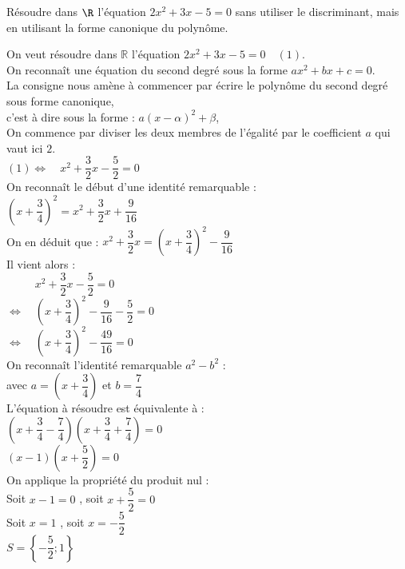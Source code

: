 \documentclass[a4paper,11pt,exos]{nsi} %
\begin{document}
\maketitle

\begin{exercice}%
    Résoudre dans $\R$ l'équation $2x^2+3x-5=0$ sans utiliser le discriminant, mais en utilisant la forme canonique du polynôme.
    
\end{exercice}

On veut résoudre dans $\mathbb{R}$ l'équation $2x^2+3x-5=0\quad(1)$.\\On reconnaît une équation du second degré sous la forme $ax^2+bx+c = 0$.\\La consigne nous amène à commencer par écrire le polynôme du second degré sous forme canonique, \\c'est à dire sous la forme :  $a(x-\alpha)^2+\beta$,\\On commence par diviser les deux membres de l'égalité par le coefficient $a$ qui vaut ici $2$.\\$(1)\iff\quad x^2 +\dfrac{3}{2} x -\dfrac{5}{2}=0$\\[.5em]On reconnaît le début d'une identité remarquable :\\$\left(x +\dfrac{3}{4}\right)^2=x^2 +\dfrac{3}{2}x+\dfrac{9}{16} $\\On en déduit que :  $x^2 +\dfrac{3}{2}x= \left(x +\dfrac{3}{4}\right)^2    -\dfrac{9}{16} $\\Il vient alors :\\$\phantom{\iff}\quad x^2 +\dfrac{3}{2} x -\dfrac{5}{2}=0$\\$\iff\quad  \left(x +\dfrac{3}{4}\right)^2    -\dfrac{9}{16}-\dfrac{5}{2}=0$\\$\iff\quad  \left(x +\dfrac{3}{4}\right)^2    -\dfrac{49}{16}=0$\\On reconnaît l'identité remarquable $a^2-b^2$ :\\avec  $a= \left(x +\dfrac{3}{4}\right)$ et $b =\dfrac{7}{4}$\\L'équation à résoudre est équivalente à :\\ $\left(x +\dfrac{3}{4}-\dfrac{7}{4}\right)\left(x +\dfrac{3}{4}+\dfrac{7}{4}\right)=0$\\ $\left(x -1\right)\left(x +\dfrac{5}{2}\right)=0$\\ On applique la propriété du produit nul :\\ Soit $x -1=0$ , soit $x +\dfrac{5}{2}=0$\\ Soit $x = 1$ , soit $x = -\dfrac{5}{2}$\\ $S =\left\{-\dfrac{5}{2};1\right\}$
\end{document}
